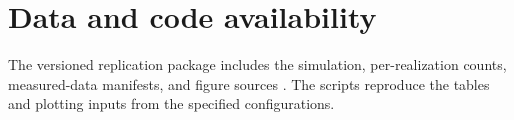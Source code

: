 \documentclass[nofoot]{asmeconf}
\begin{document}
\section*{Data and code availability}
The versioned replication package includes the simulation, per-realization counts, measured-data manifests, and figure sources \cite{Vaught2026RadarStudy}. The scripts reproduce the tables and plotting inputs from the specified configurations.



\end{document}
